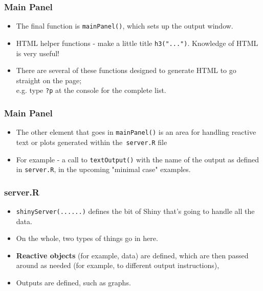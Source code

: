 \documentclass{beamer}
\begin{document}
\begin{frame}
	\frametitle{Main Panel}
	\Large
	\vspace{-1cm}
	\begin{itemize}
		\item The final function is \texttt{mainPanel()}, which sets up the output window. 
		\item  HTML helper functions - make a little title \texttt{h3("...")}. Knowledge of HTML is very useful!
		\item There are several of these functions designed to generate HTML to go straight on
		the page; \\e.g. type \texttt{?p} at the console for the complete list. 
	\end{itemize}
\end{frame}
\begin{frame}
	\Large
	\frametitle{Main Panel}
	\begin{itemize}
		\item The other element that goes in
		\texttt{mainPanel()} is an area for handling reactive text or plots generated within the\texttt{ server.R}
		file
		\item For example - a call to \texttt{textOutput()} with the name of the output as defined in
		\texttt{server.R}, in the upcoming "minimal case" examples.
	\end{itemize}
\end{frame}
\begin{frame}
	\frametitle{server.R}
	\Large
	
	\begin{itemize}
		\item \texttt{shinyServer(...{...})} defines the bit of Shiny that's
		going to handle all the data. 
		\item On the whole, two types of things go in here. \item \textbf{Reactive
			objects} (for example, data) are defined, which are then passed around as needed (for
		example, to different output instructions), \item Outputs are defined, such as graphs.
	\end{itemize}
\end{frame}
\end{document}
